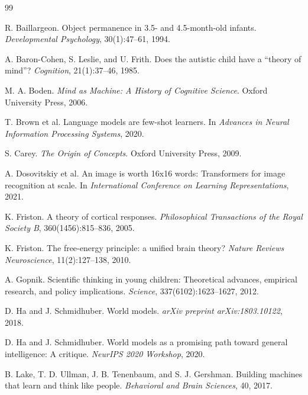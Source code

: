 \documentclass[11pt,oneside]{article}
\begin{document}

\begin{thebibliography}{99}

R. Baillargeon.
\newblock Object permanence in 3.5- and 4.5-month-old infants.
\newblock \emph{Developmental Psychology}, 30(1):47--61, 1994.

A. Baron-Cohen, S. Leslie, and U. Frith.
\newblock Does the autistic child have a ``theory of mind''?
\newblock \emph{Cognition}, 21(1):37--46, 1985.

M. A. Boden.
\emph{Mind as Machine: A History of Cognitive Science}.
\newblock Oxford University Press, 2006.

T. Brown et al.
\newblock Language models are few-shot learners.
\newblock In \emph{Advances in Neural Information Processing Systems}, 2020.

S. Carey.
\emph{The Origin of Concepts}.
\newblock Oxford University Press, 2009.

A. Dosovitskiy et al.
\newblock An image is worth 16x16 words: Transformers for image recognition at scale.
\newblock In \emph{International Conference on Learning Representations}, 2021.

K. Friston.
\newblock A theory of cortical responses.
\newblock \emph{Philosophical Transactions of the Royal Society B}, 360(1456):815--836, 2005.

K. Friston.
\newblock The free-energy principle: a unified brain theory?
\newblock \emph{Nature Reviews Neuroscience}, 11(2):127--138, 2010.

A. Gopnik.
\newblock Scientific thinking in young children: Theoretical advances, empirical research, and policy implications.
\newblock \emph{Science}, 337(6102):1623--1627, 2012.

D. Ha and J. Schmidhuber.
\newblock World models.
\newblock \emph{arXiv preprint arXiv:1803.10122}, 2018.

D. Ha and J. Schmidhuber.
\newblock World models as a promising path toward general intelligence: A critique.
\newblock \emph{NeurIPS 2020 Workshop}, 2020.

B. Lake, T. D. Ullman, J. B. Tenenbaum, and S. J. Gershman.
\newblock Building machines that learn and think like people.
\newblock \emph{Behavioral and Brain Sciences}, 40, 2017.


\end{thebibliography}
\end{document}
